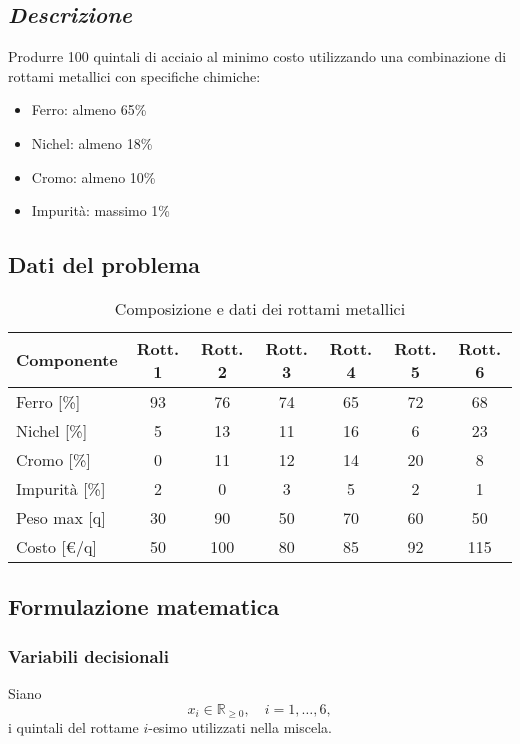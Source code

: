 \subsection{\textbf{\textit{Descrizione}}}
Produrre 100 quintali di acciaio al minimo costo utilizzando una combinazione di rottami metallici con specifiche chimiche:
\begin{itemize}
    \item Ferro: almeno 65\%
    \item Nichel: almeno 18\%
    \item Cromo: almeno 10\%
    \item Impurità: massimo 1\%
\end{itemize}

\subsection{Dati del problema}
\begin{table}[h]
\centering
\begin{tabular}{|l|c|c|c|c|c|c|}

\hline
\textbf{Componente} & \textbf{Rott. 1} & \textbf{Rott. 2} & \textbf{Rott. 3} & \textbf{Rott. 4} & \textbf{Rott. 5} & \textbf{Rott. 6} \\
\hline
Ferro [\%]       & 93  & 76  & 74  & 65  & 72  & 68  \\
\hline
Nichel [\%]      & 5   & 13  & 11  & 16  & 6   & 23  \\
\hline
Cromo [\%]       & 0   & 11  & 12  & 14  & 20  & 8   \\
\hline
Impurità [\%]    & 2   & 0   & 3   & 5   & 2   & 1   \\
\hline
Peso max [q]     & 30  & 90  & 50  & 70  & 60  & 50  \\
\hline
Costo [€/q]      & 50  & 100 & 80  & 85  & 92  & 115 \\
\hline
\end{tabular}
\caption{Composizione e dati dei rottami metallici}
\end{table}

\subsection{Formulazione matematica}

\subsubsection{Variabili decisionali}
Siano 
\[ 
x_i \in \mathbb{R}_{\geq 0}, \quad i=1,\dots,6,
\]
i quintali del rottame $i$-esimo utilizzati nella miscela.

